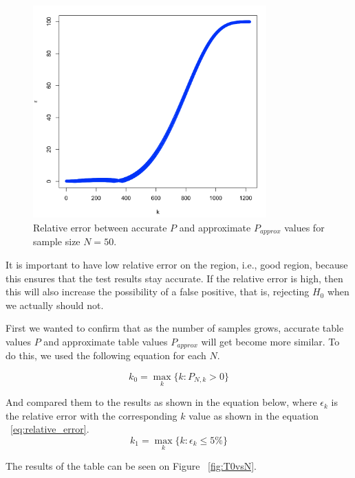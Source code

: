 \documentclass[12pt]{article}
\begin{document}
{\begin{figure}[H]
  \centering
  \includegraphics[width=0.8\textwidth]{approximate_accurate_epsilon}
  \caption{Relative error between accurate $P$ and approximate $P_{approx}$ values for sample size $N=50$.}
  \label{fig:epsilon_difference}
\end{figure}

It is important to have low relative error on the region, i.e., good region, because this ensures that the test results stay accurate. If the relative error is high, then this will also increase the possibility of a false positive, that is, rejecting $H_0$ when we actually should not.

First we wanted to confirm that as the number of samples grows, accurate table values $P$ and approximate table values $P_{approx}$ will get become more similar. To do this, we used the following equation for each $N$.

\begin{equation}
  k_0 = \max_k \{ k: P_{N, k} > 0 \}
\end{equation}

And compared them to the results as shown in the equation below, where $\epsilon_k$ is the relative error with the corresponding $k$ value as shown in the equation ~\eqref{eq:relative_error}.
\begin{equation}
  k_1 = \max_k \{ k: \epsilon_k \leq 5\% \}
\end{equation}

The results of the table can be seen on Figure ~\ref{fig:T0vsN}.

}
\end{document}
